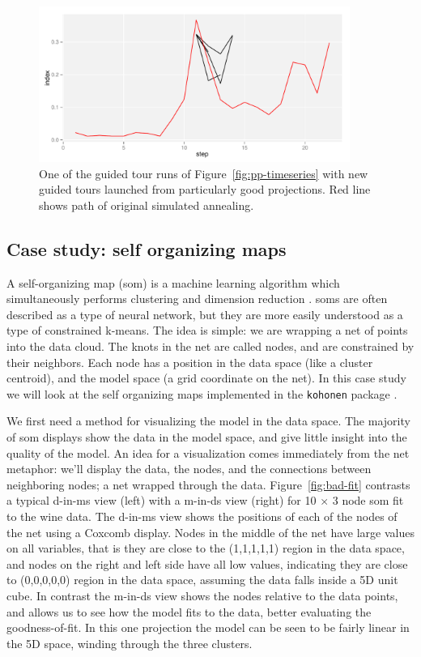 \documentclass[preprint]{imsart}
\begin{document}
\begin{figure}[htbp]
  \centering
  \includegraphics[width=4in]{pp-restart}
  \caption{One of the guided tour runs of Figure~\ref{fig:pp-timeseries} with new guided tours launched from particularly good projections.  Red line shows path of original simulated annealing.}
  \label{fig:pp-multiple-starts}
\end{figure}


\subsection{Case study: self organizing maps}
\label{sub:som}

A self-organizing map ({\sc som}) is a machine learning algorithm which  simultaneously performs clustering and dimension reduction \citep{kohonen:2001}. {\sc som}s are often described as a type of neural network, but they are more easily understood as a type of constrained k-means.   The idea is simple: we are wrapping a net of points into the data cloud. The knots in the net are called nodes, and are constrained by their neighbors.  Each node has a position in the data space (like a cluster centroid), and the model space (a grid coordinate on the net).  In this case study we will look at the self organizing maps implemented in the {\tt kohonen} package \citep{kohonen}.

We first need a method for visualizing the model in the data space.  The majority of {\sc som} displays show the data in the model space, and give little insight into the quality of the model.  An idea for a visualization comes immediately from the net metaphor: we'll display the data, the nodes, and the connections between neighboring nodes; a net wrapped through the data.  Figure~\ref{fig:bad-fit} contrasts a typical d-in-ms view (left) with a m-in-ds view (right) for 10 $\times$ 3 node som fit to the wine data. The d-in-ms view shows the positions of each of the nodes of the net using a Coxcomb display. Nodes in the middle of the net have large values on all variables, that is they are close to the (1,1,1,1,1) region in the data space, and nodes on the right and left side have all low values, indicating they are close to (0,0,0,0,0) region  in the data space, assuming the data falls inside a 5D unit cube. In contrast the m-in-ds view shows the nodes relative to the data points, and allows us to see how the model fits to the data, better evaluating the goodness-of-fit. In this one projection the model can be seen to be fairly linear in the 5D space, winding through the three clusters.
\end{document}

